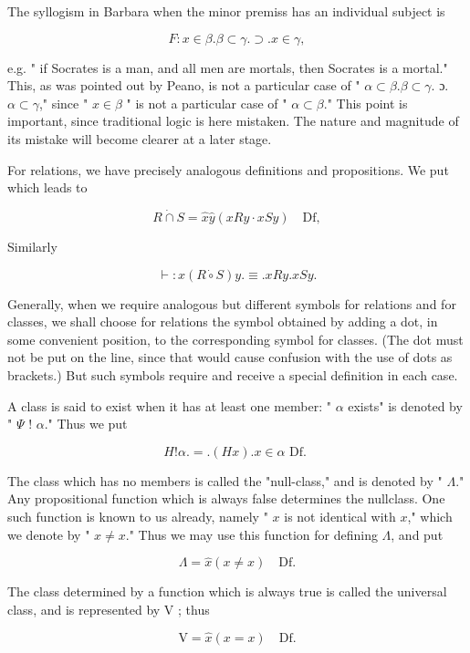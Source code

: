 \documentclass[10pt]{article}
\begin{document}
The syllogism in Barbara when the minor premiss has an individual subject is

$$
F: x \in \beta . \beta \subset \gamma . \supset . x \in \gamma,
$$

e.g. " if Socrates is a man, and all men are mortals, then Socrates is a mortal." This, as was pointed out by Peano, is not a particular case of " $\alpha \subset \beta . \beta \subset \gamma$. ɔ.$\alpha \subset \gamma$," since " $x \in \beta$ " is not a particular case of " $\alpha \subset \beta$." This point is important, since traditional logic is here mistaken. The nature and magnitude of its mistake will become clearer at a later stage.

For relations, we have precisely analogous definitions and propositions. We put\\
which leads to

$$
R \dot{\cap} S=\hat{x} \hat{y}(x R y \cdot x S y) \quad \mathrm{Df},
$$

Similarly

$$
\vdash: x(R \dot{\circ} S) y . \equiv . x R y . x S y .
$$

Generally, when we require analogous but different symbols for relations and for classes, we shall choose for relations the symbol obtained by adding a dot, in some convenient position, to the corresponding symbol for classes. (The dot must not be put on the line, since that would cause confusion with the use of dots as brackets.) But such symbols require and receive a special definition in each case.

A class is said to exist when it has at least one member: " $\alpha$ exists" is denoted by " $\Psi$ ! $\alpha$." Thus we put

$$
H!\alpha .=.(H x) . x \in \alpha \text { Df. }
$$

The class which has no members is called the "null-class," and is denoted by " $\Lambda$." Any propositional function which is always false determines the nullclass. One such function is known to us already, namely " $x$ is not identical with $x$," which we denote by " $x \neq x$." Thus we may use this function for defining $\Lambda$, and put

$$
\Lambda=\widehat{x}(x \neq x) \quad \mathrm{Df} .
$$

The class determined by a function which is always true is called the universal class, and is represented by V ; thus

$$
\mathrm{V}=\hat{x}(x=x) \quad \mathrm{Df} .
$$
\end{document}
